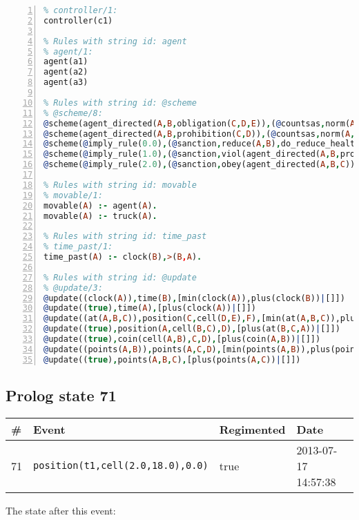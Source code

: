 \documentclass[11pt]{article}\usepackage[utf8]{inputenc}\usepackage{geometry}
\begin{document}
\begin{lstlisting}[language=Prolog, numbers=left]
% Rules with string id: controller
% controller/1:
controller(c1)

% Rules with string id: agent
% agent/1:
agent(a1)
agent(a2)
agent(a3)

% Rules with string id: @scheme
% @scheme/8:
@scheme(agent_directed(A,B,obligation(C,D,E)),(@countsas,norm(A,B,F,obligation(C,D,E)),F),false,(listTrue(C)),(time_past(D)),false,[plus(viol(agent_directed(A,B,obligation(C,D,E))))|[]],[plus(obey(agent_directed(A,B,obligation(C,D,E))))|[]])
@scheme(agent_directed(A,B,prohibition(C,D)),(@countsas,norm(A,B,E,prohibition(C,D)),E),(listTrue(C)),false,(false),false,[plus(viol(agent_directed(A,B,prohibition(C,D))))|[]],[plus(obey(agent_directed(A,B,prohibition(C,D))))|[]])
@scheme(@imply_rule(0.0),(@sanction,reduce(A,B),do_reduce_health(A,B),notifyAgent(A,changed(status))),true,false,false,false,[min(reduce(A,B))|[]],[])
@scheme(@imply_rule(1.0),(@sanction,viol(agent_directed(A,B,prohibition(C,D))),do_sanction(D)),true,false,false,false,[min(viol(agent_directed(A,B,prohibition(C,D))))|[]],[])
@scheme(@imply_rule(2.0),(@sanction,obey(agent_directed(A,B,C))),true,false,false,false,[min(obey(agent_directed(A,B,C)))|[]],[])

% Rules with string id: movable
% movable/1:
movable(A) :- agent(A).
movable(A) :- truck(A).

% Rules with string id: time_past
% time_past/1:
time_past(A) :- clock(B),>(B,A).

% Rules with string id: @update
% @update/3:
@update((clock(A)),time(B),[min(clock(A)),plus(clock(B))|[]])
@update((true),time(A),[plus(clock(A))|[]])
@update((at(A,B,C)),position(C,cell(D,E),F),[min(at(A,B,C)),plus(at(D,E,C))|[]])
@update((true),position(A,cell(B,C),D),[plus(at(B,C,A))|[]])
@update((true),coin(cell(A,B),C,D),[plus(coin(A,B))|[]])
@update((points(A,B)),points(A,C,D),[min(points(A,B)),plus(points(A,D))|[]])
@update((true),points(A,B,C),[plus(points(A,C))|[]])

\end{lstlisting}
\clearpage 
\subsection{Prolog state 71}
\begin{table}[ht]
\centering 
\begin{tabular}{l l l l} 
\textbf{\#} & \textbf{Event} & \textbf{Regimented} & \textbf{Date} \\ [0.5ex] 
\hline
71&\texttt{position(t1,cell(2.0,18.0),0.0)}&true&2013-07-17 14:57:38\\ [1ex] \hline\end{tabular}
\end{table}
The state after this event:
\end{document}
